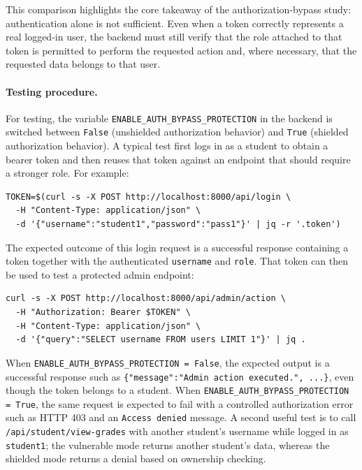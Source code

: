 \documentclass[11pt,a4paper]{article}
\begin{document}
This comparison highlights the core takeaway of the authorization-bypass study: authentication alone is not sufficient. Even when a token correctly represents a real logged-in user, the backend must still verify that the role attached to that token is permitted to perform the requested action and, where necessary, that the requested data belongs to that user.

\paragraph{Testing procedure.}
For testing, the variable \texttt{ENABLE\_AUTH\_BYPASS\_PROTECTION} in the backend is switched between \texttt{False} (unshielded authorization behavior) and \texttt{True} (shielded authorization behavior). A typical test first logs in as a student to obtain a bearer token and then reuses that token against an endpoint that should require a stronger role. For example:

\begin{verbatim}
TOKEN=$(curl -s -X POST http://localhost:8000/api/login \
  -H "Content-Type: application/json" \
  -d '{"username":"student1","password":"pass1"}' | jq -r '.token')
\end{verbatim}

The expected outcome of this login request is a successful response containing a token together with the authenticated \texttt{username} and \texttt{role}. That token can then be used to test a protected admin endpoint:

\begin{verbatim}
curl -s -X POST http://localhost:8000/api/admin/action \
  -H "Authorization: Bearer $TOKEN" \
  -H "Content-Type: application/json" \
  -d '{"query":"SELECT username FROM users LIMIT 1"}' | jq .
\end{verbatim}

When \texttt{ENABLE\_AUTH\_BYPASS\_PROTECTION = False}, the expected output is a successful response such as \texttt{\{"message":"Admin action executed.", ...\}}, even though the token belongs to a student. When \texttt{ENABLE\_AUTH\_BYPASS\_PROTECTION = True}, the same request is expected to fail with a controlled authorization error such as HTTP 403 and an \texttt{Access denied} message. A second useful test is to call \texttt{/api/student/view-grades} with another student's username while logged in as \texttt{student1}; the vulnerable mode returns another student's data, whereas the shielded mode returns a denial based on ownership checking.
\end{document}
